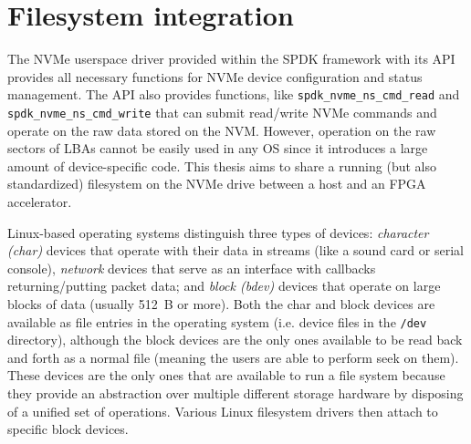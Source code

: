 \chapter{Filesystem integration}
\label{chap:filesystem}

The NVMe userspace driver provided within the SPDK framework\cite{spdk_usp_drivers} with its API
provides all necessary functions for NVMe device configuration and status
management\footnotemark. The API also provides functions, like \verb|spdk_nvme_ns_cmd_read| and
\verb|spdk_nvme_ns_cmd_write| that can submit read/write NVMe commands and operate on the raw data
stored on the \ac{NVM}. However, operation on the raw sectors of \acp{LBA} cannot be easily used in
any OS since it introduces a large amount of device-specific code. This thesis aims to share a
running (but also standardized) filesystem on the NVMe drive between a host and an FPGA accelerator.


Linux-based operating systems distinguish three types of devices: \emph{character (char)}
devices that operate with their data in streams (like a sound card or serial console),
\emph{network} devices that serve as an interface with callbacks returning/putting packet data;
and \emph{block (bdev)} devices that operate on large blocks of data (usually 512~B or more). Both
the char and block devices are available as file entries in the operating system (i.e. device files
in the \verb|/dev| directory), although the block devices are the only ones available to be read
back and forth as a normal file (meaning the users are able to perform seek on them)\footnotemark.
These devices are the only ones that are available to run a file system\cite{linux_drivers}
because they provide an abstraction over multiple different storage hardware by disposing of a
unified set of operations\cite{spdk_paper}. Various Linux filesystem drivers then attach to specific
block devices.

